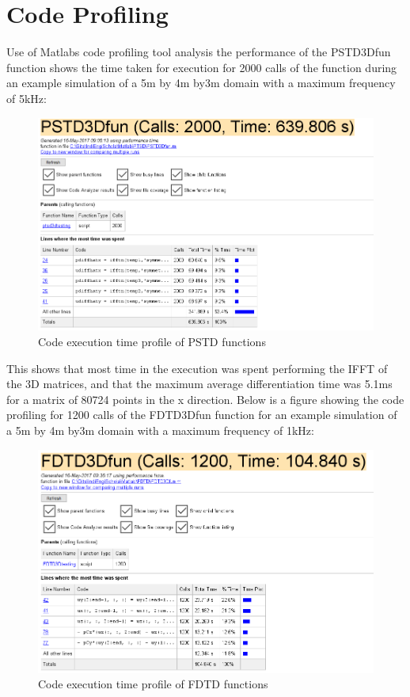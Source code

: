 \section{Code Profiling}
Use of Matlabs code profiling tool analysis the performance of the PSTD3Dfun function shows the time taken for execution for 2000 calls of the function during an example simulation of a 5m by 4m by3m domain with a maximum frequency of 5kHz:\\
\begin{figure}[H]
\centering
  \includegraphics[width=\textwidth]{./graphics/pstdfunctioncodeprofile.png}
  \caption{Code execution time profile of PSTD functions}
\end{figure}
This shows that most time in the execution was spent performing the IFFT of the 3D matrices, and that the maximum average differentiation time was 5.1ms for a matrix of 80724 points in the x direction. Below is a figure showing the code profiling for 1200 calls of the FDTD3Dfun function for an example simulation of a 5m by 4m by3m domain with a maximum frequency of 1kHz:\\
\begin{figure}[H]
\centering
  \includegraphics[width=\textwidth]{./graphics/fdtdfunctioncodeprofile.png}
  \caption{Code execution time profile of FDTD functions}
\end{figure}

